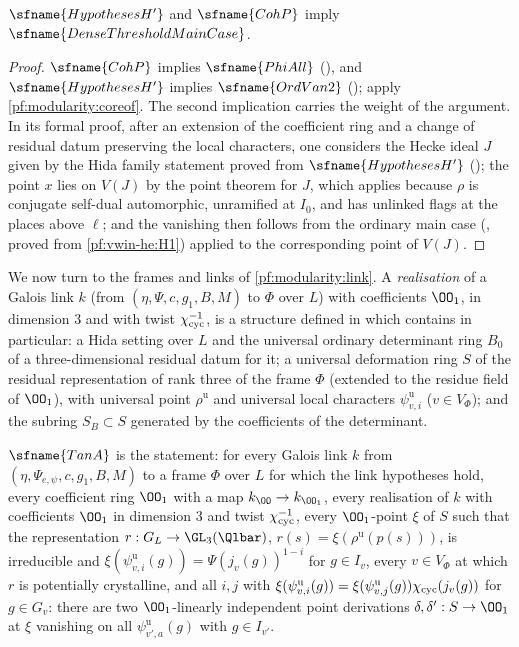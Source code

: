 \begin{theorem}\label{pf:modularity:core}
$\sfname{HypothesesH'}$ and $\sfname{CohP}$ imply $\sfname{DenseThresholdMainCase}$.
\end{theorem}

\begin{proof}
$\sfname{CohP}$ implies $\sfname{PhiAll}$ (), and $\sfname{HypothesesH'}$ implies
$\sfname{OrdVan2}$ (); apply \cref{pf:modularity:coreof}.
The second implication carries the weight of the argument. In its formal proof, after an extension of the coefficient ring
and a change of residual datum preserving the local characters, one considers the Hecke ideal $J$ given by the Hida family
statement proved from $\sfname{HypothesesH'}$ (); the point $x$ lies on
$V(J)$ by the point theorem for $J$, which applies because $\rho$ is conjugate self-dual automorphic, unramified at $I_0$,
and has unlinked flags at the places above $\ell$; and the vanishing then follows from the ordinary main case
(, proved from \ref{pf:vwin-he:H1}) applied to the
corresponding point of $V(J)$.
\end{proof}

We now turn to the frames and links of \cref{pf:modularity:link}. A \emph{realisation} of a Galois link $k$ (from
$(\eta,\Psi,c,g_1,B,M)$ to $\Phi$ over $L$) with coefficients $\OO_1$, in dimension $3$ and with twist
$\chi_{\mathrm{cyc}}^{-1}$, is a structure defined in \cite{LeanSource2026} which contains in particular: a Hida setting over $L$
and the universal ordinary determinant ring $B_0$ of a three-dimensional residual datum for it; a universal deformation ring
$S$ of the residual representation of rank three of the frame $\Phi$ (extended to the residue field of $\OO_1$), with
universal point $\rho^{\mathrm u}$ and universal local characters $\psi^{\mathrm u}_{v,i}$ ($v\in V_\Phi$); and the subring
$S_B\subset S$ generated by the coefficients of the determinant.

\begin{definition}\label{pf:modularity:tanAdef}
$\sfname{TanA}$ is the statement: for every Galois link $k$ from $(\eta,\Psi_{e,\psi},c,g_1,B,M)$ to a frame $\Phi$ over $L$
for which the link hypotheses hold, every coefficient ring $\OO_1$ with a map $k_\OO\to k_{\OO_1}$, every realisation of $k$
with coefficients $\OO_1$ in dimension $3$ and twist $\chi_{\mathrm{cyc}}^{-1}$, every $\OO_1$-point $\xi$ of $S$ such that the
representation $r:G_L\to\GL_3(\Qlbar)$, $r(s)=\xi(\rho^{\mathrm u}(p(s)))$, is irreducible and
$\xi(\psi^{\mathrm u}_{v,i}(g))=\Psi(j_v(g))^{1-i}$ for $g\in I_v$, every $v\in V_\Phi$ at which $r$ is potentially
crystalline, and all $i,j$ with $\xi(\psi^{\mathrm u}_{v,i}(g))=\xi(\psi^{\mathrm u}_{v,j}(g))\chi_{\mathrm{cyc}}(j_v(g))$ for
$g\in G_v$: there are two $\OO_1$-linearly independent point derivations $\delta,\delta':S\to\OO_1$ at $\xi$ vanishing on all
$\psi^{\mathrm u}_{v',a}(g)$ with $g\in I_{v'}$.
\end{definition}

